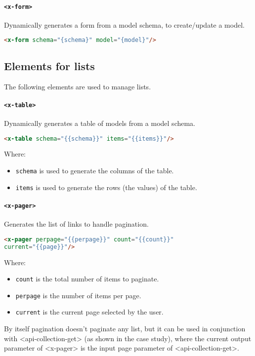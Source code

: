 \paragraph{\texttt{<x-form>}} Dynamically generates a form from a model schema, to create/update a model.
\begin{lstlisting}[language=html]
<x-form schema="{schema}" model="{model}"/>
\end{lstlisting}

\subsection{Elements for lists}

The following elements are used to manage lists.

\paragraph{\texttt{<x-table>}} Dynamically generates a table of models from a model schema.
\begin{lstlisting}[language=html]
<x-table schema="{{schema}}" items="{{items}}"/>
\end{lstlisting}
Where:
\begin{itemize}
\item \texttt{schema} is used to generate the columns of the table. 
\item \texttt{items} is used to generate the rows (the values) of the table.
\end{itemize}

\paragraph{\texttt{<x-pager>}} Generates the list of links to handle pagination.
\begin{lstlisting}[language=html]
<x-pager perpage="{{perpage}}" count="{{count}}" 
current="{{page}}"/>
\end{lstlisting}
Where:
\begin{itemize}
\item \texttt{count} is the total number of items to paginate.
\item \texttt{perpage} is the number of items per page.
\item \texttt{current} is the current page selected by the user.
\end{itemize}

By itself pagination doesn’t paginate any list, but it can be used in conjunction with <api-collection-get> (as shown in the case study), where the current output parameter of <x-pager> is the input page parameter of  <api-collection-get>.


